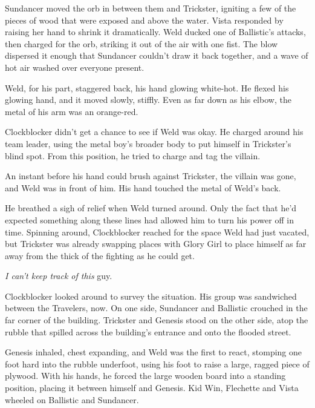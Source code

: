 Sundancer moved the orb in between them and Trickster, igniting a few of the pieces of wood that were exposed and above the water.  Vista responded by raising her hand to shrink it dramatically.  Weld ducked one of Ballistic's attacks, then charged for the orb, striking it out of the air with one fist.  The blow dispersed it enough that Sundancer couldn't draw it back together, and a wave of hot air washed over everyone present.



Weld, for his part, staggered back, his hand glowing white-hot.  He flexed his glowing hand, and it moved slowly, stiffly.  Even as far down as his elbow, the metal of his arm was an orange-red.



Clockblocker didn't get a chance to see if Weld was okay.  He charged around his team leader, using the metal boy's broader body to put himself in Trickster's blind spot.  From this position, he tried to charge and tag the villain.



An instant before his hand could brush against Trickster, the villain was gone, and Weld was in front of him.  His hand touched the metal of Weld's back.



He breathed a sigh of relief when Weld turned around.  Only the fact that he'd expected something along these lines had allowed him to turn his power off in time.  Spinning around, Clockblocker reached for the space Weld had just vacated, but Trickster was already swapping places with Glory Girl to place himself as far away from the thick of the fighting as he could get.



\emph{I can't keep track of this} guy.



Clockblocker looked around to survey the situation.  His group was sandwiched between the Travelers, now.  On one side, Sundancer and Ballistic crouched in the far corner of the building.  Trickster and Genesis stood on the other side, atop the rubble that spilled across the building's entrance and onto the flooded street.



Genesis inhaled, chest expanding, and Weld was the first to react, stomping one foot hard into the rubble underfoot, using his foot to raise a large, ragged piece of plywood.  With his hands, he forced the large wooden board into a standing position, placing it between himself and Genesis.  Kid Win, Flechette and Vista wheeled on Ballistic and Sundancer.



